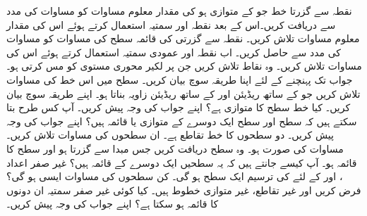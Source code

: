 نقطہ  سے گزرتا خط جو  کے متوازی ہو کی مقدار معلوم مساوات   کو مساوات  کی مدد سے  دریافت کریں۔اس کے بعد نقطہ  اور سمتیہ  استعمال کرتے ہوئے اس کی مقدار معلوم مساوات تلاش کریں۔
نقطہ  سے گزرتی  کی قائمہ سطح کی مساوات کو  مساوات کی مدد سے حاصل کریں۔ اب نقطہ  اور عمودی سمتیہ  استعمال کرتے ہوئے اس کی مساوات تلاش کریں۔
وہ نقاط تلاش کریں جن پر لکیر  محوری مستوی کو مس کرتی ہو۔ جواب تک پہنچنے کے لئے اپنا   طریقہ سوچ بیان کریں۔
سطح  میں اس خط کی مساوات تلاش کریں جو  کے ساتھ  ریڈیئن اور  کے ساتھ  ریڈیئن زاویہ بناتا ہو۔ اپنے طریقہ سوچ بیان کریں۔
کیا خط  سطح  کا متوازی ہے؟ اپنے جواب کی وجہ پیش کریں۔
آپ کس طرح بتا سکتے ہیں کہ سطح  اور سطح  ایک دوسرے کے متوازی  یا قائمہ ہیں؟ اپنے جواب کی وجہ پیش کریں۔
دو سطحوں کا خط تقاطع  ہے۔  ان سطحوں کی مساوات تلاش کریں۔ مساوات کی صورت  ہو۔
وہ سطح دریافت کریں جس مبدا سے گزرتا ہو اور سطح  کا قائمہ ہو۔ آپ کیسے جانتے ہیں کہ یہ سطحیں ایک دوسرے کے قائمہ ہیں؟
غیر صفر اعداد ،  اور  کے لئے  کی ترسیم ایک سطح ہو گی۔ کن سطحوں کی مساوات ایسی ہو گی؟
فرض کریں  اور  غیر  تقاطع، غیر متوازی خطوط ہیں۔ کیا کوئی غیر صفر سمتیہ ان دونوں کا قائمہ ہو سکتا ہے؟ اپنے جواب کی وجہ پیش کریں۔

